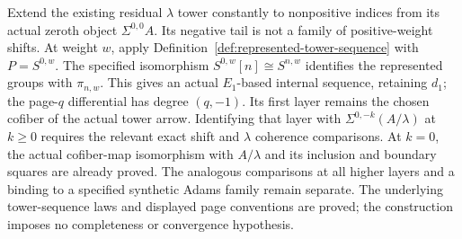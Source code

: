 \begin{definition}
  \label{def:lambda-weightwise-sequence}
  \leanok
  Extend the existing residual $\lambda$ tower constantly to nonpositive
  indices from its actual zeroth object $\Sigma^{0,0}A$. Its negative tail
  is not a family of positive-weight shifts. At weight $w$, apply
  Definition~\ref{def:represented-tower-sequence} with $P=S^{0,w}$.
  The specified isomorphism $S^{0,w}[n]\cong S^{n,w}$ identifies the
  represented groups with $\pi_{n,w}$.
  This gives an actual $E_1$-based internal sequence, retaining $d_1$;
  the page-$q$ differential has degree $(q,-1)$. Its first layer remains the chosen cofiber
  of the actual tower arrow. Identifying that layer with
  $\Sigma^{0,-k}(A/\lambda)$ at $k\ge0$ requires the relevant exact shift and
  $\lambda$ coherence comparisons. At $k=0$, the actual cofiber-map
  isomorphism with $A/\lambda$ and its inclusion and boundary squares
  are already proved. The analogous comparisons at all higher layers
  and a binding to a specified synthetic Adams family remain separate.
  The underlying tower-sequence laws and displayed page conventions are
  proved; the construction imposes no completeness or convergence hypothesis.
\end{definition}

